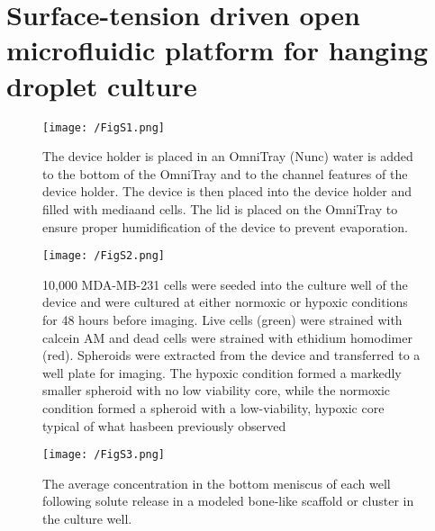 \chapter{Surface-tension driven open microfluidic platform for hanging droplet culture}
\label{App:HangingDroplet}

\begin{figure}[ht] %
\centering
\texttt{[image: /FigS1.png]}
\caption{The device holder is placed in an OmniTray (Nunc) water is added to the bottom of the OmniTray and to the channel features of the device holder. The device is then placed into the device holder and filled with mediaand cells. The lid is placed on the OmniTray to ensure proper humidification of the device to prevent evaporation.}
\label{figure:FigS1}
\end{figure}

\begin{figure}[ht] %
\centering
\texttt{[image: /FigS2.png]}
\caption{10,000 MDA-MB-231 cells were seeded into the culture well of the device and were cultured at either normoxic or hypoxic conditions for 48 hours before imaging. Live cells (green) were strained with calcein AM and dead cells were strained with ethidium homodimer (red). Spheroids were extracted from the device and transferred to a well plate for imaging. The hypoxic condition formed a markedly smaller spheroid with no low viability core, while the normoxic condition formed a spheroid with a low-viability, hypoxic core typical of what hasbeen previously observed}
\label{figure:FigS2}
\end{figure}

\begin{figure}[ht] %
\centering
\texttt{[image: /FigS3.png]}
\caption{The average concentration in the bottom meniscus of each well following solute release in a modeled bone-like scaffold or cluster in the culture well.}
\label{figure:FigS3}
\end{figure}